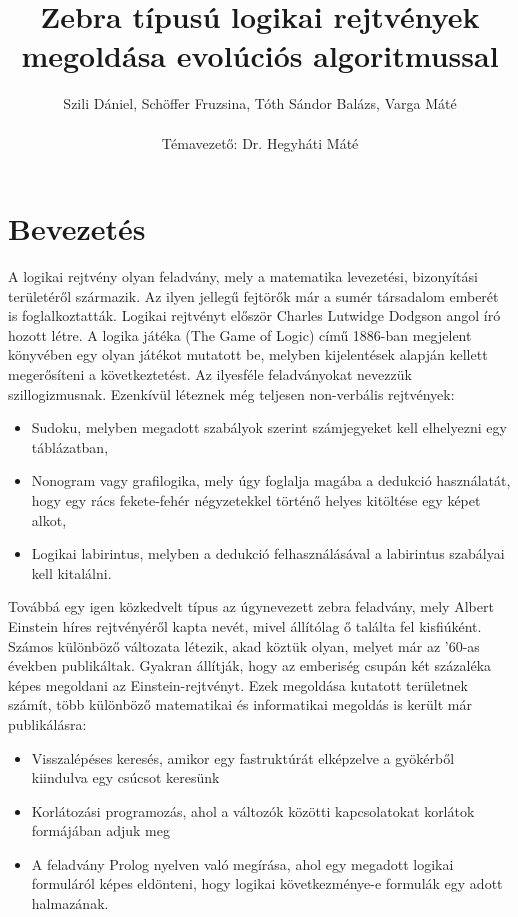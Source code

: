 \documentclass[12ppt,a4paper,oneside]{report}
\author{Szili Dániel, Schöffer Fruzsina, Tóth Sándor Balázs, Varga Máté\\\ \\Témavezető: Dr. Hegyháti Máté}
\title{Zebra típusú logikai rejtvények megoldása evolúciós algoritmussal}
\begin{document}
\maketitle

\tableofcontents

\chapter{Bevezetés} %
	A logikai rejtvény olyan feladvány, mely a matematika levezetési, bizonyítási területéről származik.
    Az ilyen jellegű fejtörők már a sumér társadalom emberét is foglalkoztatták. Logikai rejtvényt először Charles Lutwidge Dodgson angol író hozott létre.
    A logika játéka (The Game of Logic) című 1886-ban megjelent könyvében egy olyan játékot mutatott be, melyben kijelentések alapján kellett megerősíteni a következtetést.
    Az ilyesféle feladványokat nevezzük szillogizmusnak.
    Ezenkívül léteznek még teljesen non-verbális rejtvények:
	\begin{itemize}
        \item Sudoku, melyben megadott szabályok szerint számjegyeket kell elhelyezni egy táblázatban,
        \item Nonogram vagy grafilogika, mely úgy foglalja magába a dedukció használatát, hogy egy rács fekete-fehér négyzetekkel történő helyes kitöltése egy képet alkot,
        \item Logikai labirintus, melyben a dedukció felhasználásával a labirintus szabályai kell kitalálni.
	\end{itemize}

	Továbbá egy igen közkedvelt típus az úgynevezett zebra feladvány, mely Albert Einstein híres rejtvényéről kapta nevét, mivel állítólag ő találta fel kisfiúként.
    Számos különböző változata létezik, akad köztük olyan, melyet már az ’60-as években publikáltak.
    Gyakran állítják, hogy az emberiség csupán két százaléka képes megoldani az Einstein-rejtvényt.
    Ezek megoldása kutatott területnek számít, több különböző matematikai és informatikai megoldás is került már publikálásra:
	\begin{itemize}
        \item Visszalépéses keresés, amikor egy fastruktúrát elképzelve a gyökérből kiindulva egy csúcsot keresünk
        \item Korlátozási programozás, ahol a változók közötti kapcsolatokat korlátok formájában adjuk meg
        \item A feladvány Prolog nyelven való megírása, ahol egy megadott logikai formuláról képes eldönteni, hogy logikai következménye-e formulák egy adott halmazának.
	\end{itemize}
\end{document}
